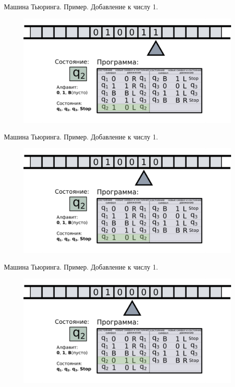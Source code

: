 \documentclass[10pt]{beamer}
\begin{document}
\begin{frame}{Машина Тьюринга. Пример. Добавление к числу 1.}
	\begin{figure}
		\centerline{\includegraphics[width=1.5\linewidth]{images/tm_ex_9.png}}
	\end{figure}
\end{frame}

\begin{frame}{Машина Тьюринга. Пример. Добавление к числу 1.}
	\begin{figure}
		\centerline{\includegraphics[width=1.5\linewidth]{images/tm_ex_10.png}}
	\end{figure}
\end{frame}


\begin{frame}{Машина Тьюринга. Пример. Добавление к числу 1.}
	\begin{figure}
		\centerline{\includegraphics[width=1.5\linewidth]{images/tm_ex_11.png}}
	\end{figure}
\end{frame}
\end{document}
